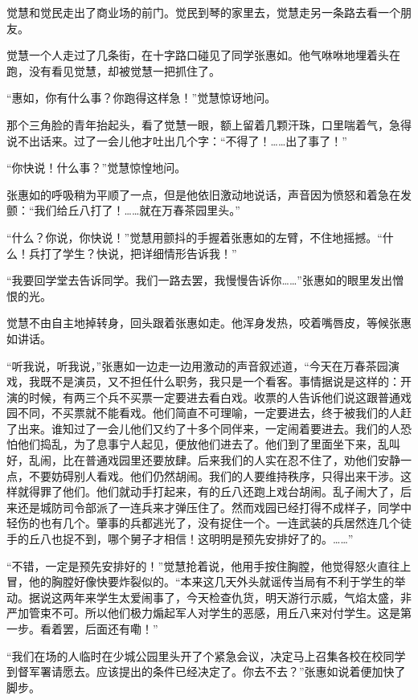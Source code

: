 \par 觉慧和觉民走出了商业场的前门。觉民到琴的家里去，觉慧走另一条路去看一个朋友。
\par 觉慧一个人走过了几条街，在十字路口碰见了同学张惠如。他气咻咻地埋着头在跑，没有看见觉慧，却被觉慧一把抓住了。
\par “惠如，你有什么事？你跑得这样急！”觉慧惊讶地问。
\par 那个三角脸的青年抬起头，看了觉慧一眼，额上留着几颗汗珠，口里喘着气，急得说不出话来。过了一会儿他才吐出几个字：“不得了！……出了事了！”
\par “你快说！什么事？”觉慧惊惶地问。
\par 张惠如的呼吸稍为平顺了一点，但是他依旧激动地说话，声音因为愤怒和着急在发颤：“我们给丘八打了！……就在万春茶园里头。”
\par “什么？你说，你快说！”觉慧用颤抖的手握着张惠如的左臂，不住地摇撼。“什么！兵打了学生？快说，把详细情形告诉我！”
\par “我要回学堂去告诉同学。我们一路去罢，我慢慢告诉你……”张惠如的眼里发出憎恨的光。
\par 觉慧不由自主地掉转身，回头跟着张惠如走。他浑身发热，咬着嘴唇皮，等候张惠如讲话。
\par “听我说，听我说，”张惠如一边走一边用激动的声音叙述道，“今天在万春茶园演戏，我既不是演员，又不担任什么职务，我只是一个看客。事情据说是这样的：开演的时候，有两三个兵不买票一定要进去看白戏。收票的人告诉他们说这跟普通戏园不同，不买票就不能看戏。他们简直不可理喻，一定要进去，终于被我们的人赶了出来。谁知过了一会儿他们又约了十多个同伴来，一定闹着要进去。我们的人恐怕他们捣乱，为了息事宁人起见，便放他们进去了。他们到了里面坐下来，乱叫好，乱闹，比在普通戏园里还要放肆。后来我们的人实在忍不住了，劝他们安静一点，不要妨碍别人看戏。他们仍然胡闹。我们的人要维持秩序，只得出来干涉。这样就得罪了他们。他们就动手打起来，有的丘八还跑上戏台胡闹。乱子闹大了，后来还是城防司令部派了一连兵来才弹压住了。然而戏园已经打得不成样子，同学中轻伤的也有几个。肇事的兵都逃光了，没有捉住一个。一连武装的兵居然连几个徒手的丘八也捉不到，哪个舅子才相信！这明明是预先安排好了的。……”
\par “不错，一定是预先安排好的！”觉慧抢着说，他用手按住胸膛，他觉得怒火直往上冒，他的胸膛好像快要炸裂似的。“本来这几天外头就谣传当局有不利于学生的举动。据说这两年来学生太爱闹事了，今天检查仇货，明天游行示威，气焰太盛，非严加管束不可。所以他们极力煽起军人对学生的恶感，用丘八来对付学生。这是第一步。看着罢，后面还有嘞！”
\par “我们在场的人临时在少城公园里头开了个紧急会议，决定马上召集各校在校同学到督军署请愿去。应该提出的条件已经决定了。你去不去？”张惠如说着便加快了脚步。
